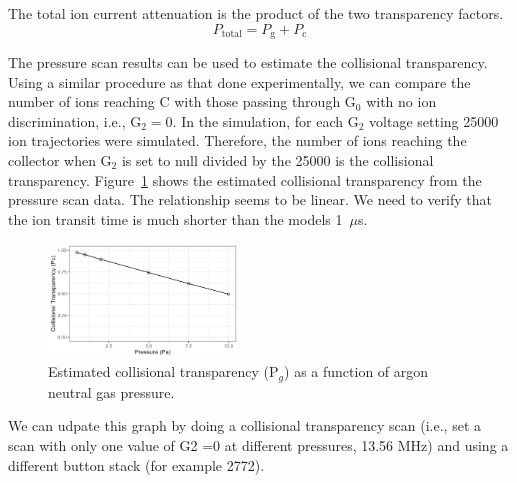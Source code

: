 The total ion current attenuation is the product of the two transparency factors.
\begin{equation}
P_{\text{total}} = P_\text{g} + P_\text{c}
\end{equation}

The pressure scan results can be used to estimate the collisional transparency. Using a similar procedure as that done experimentally, we can compare the number of ions reaching C with those passing through G$_0$ with no ion discrimination, i.e., G$_2 =0$. In the simulation, for each G$_2$ voltage setting 25000 ion trajectories were simulated. Therefore, the number of ions reaching the collector when G$_2$ is set to null divided by the 25000 is the collisional transparency. Figure~\ref{fig:CollisionalTransparency} shows the estimated collisional transparency from the pressure scan data. The relationship seems to be linear. We need to verify that the ion transit time is much shorter than the models 1~$\mu$s. 

\begin{figure}[htbp]
\centering
\includegraphics[width=0.45\textwidth]{Figures/CollisionalTransparency.jpeg}
\caption{Estimated collisional transparency (P$_g$) as a function of argon neutral gas pressure.}
\label{fig:CollisionalTransparency}
\end{figure}

We can udpate this graph by doing a collisional transparency scan (i.e., set a scan with only one value of G2 =0 at different pressures, 13.56 MHz) and using a different button stack (for example 2772).